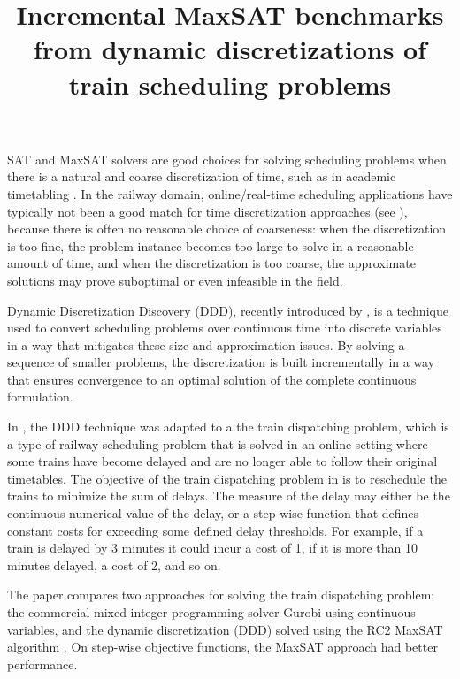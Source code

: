 \documentclass[conference]{IEEEtran}
\begin{document}
\title{Incremental MaxSAT benchmarks from dynamic discretizations of train scheduling problems}

\author{
}
\maketitle

SAT and MaxSAT solvers are good choices for solving scheduling problems when there is a
natural and coarse discretization of time, such as in academic timetabling \cite{asin2014curriculum}.
%
In the railway domain, online/real-time scheduling applications have typically not been
a good match for time discretization approaches (see \cite{mannino2009optimal, harrod2011modeling, boland2019perspectives}), because there is
often no reasonable choice of coarseness: when the discretization is too fine,
the problem instance becomes too large to solve in a reasonable amount of time, and when the discretization is
too coarse, the approximate solutions may prove suboptimal or even infeasible
in the field.

Dynamic Discretization Discovery (DDD), recently introduced by \cite{boland2017continuous}, is a
technique used to convert scheduling problems over continuous time into
discrete variables in a way that mitigates these size and approximation issues. 
By solving a sequence of smaller problems, the discretization
is built incrementally in a way that ensures convergence to an optimal
solution of the complete continuous formulation.

In \cite{croella2024maxsat}, the DDD technique was adapted to a the train dispatching problem, which
is a type of railway scheduling problem that is solved in an online
setting where some trains have become delayed and are no longer able to follow
their original timetables.  The objective of the train dispatching problem in
\cite{croella2024maxsat} is to reschedule the trains to minimize the sum of delays.
%
The measure of the delay may either be the continuous numerical value of the
delay, or a step-wise function that defines constant  costs for exceeding some
defined delay thresholds. For example, if a train is delayed by 3 minutes it could incur
a cost of 1, if it is more than 10 minutes delayed, a cost of 2, and so on.

The paper \cite{croella2024maxsat} compares two approaches
for solving the train dispatching problem:
the commercial mixed-integer programming solver 
Gurobi using continuous variables, and
the 
dynamic discretization (DDD) solved using
 the RC2  MaxSAT algorithm \cite{IgnatievRC2}.
On step-wise objective functions, the MaxSAT approach had better performance.
\end{document}
